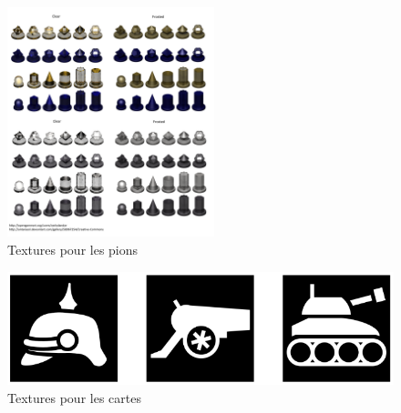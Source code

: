     \begin{figure}[!htbp]
        \centering
        \includegraphics[width=6cm]{Images/pions.png}
        \caption{Textures pour les pions}
        \label{fig:textures_pions}
    \end{figure}
    
    \begin{figure}[!htbp]
        \centering
        \includegraphics[width=14cm]{Images/cartes.png}
        \caption{Textures pour les cartes}
        \label{fig:textures_cartes}
    \end{figure}